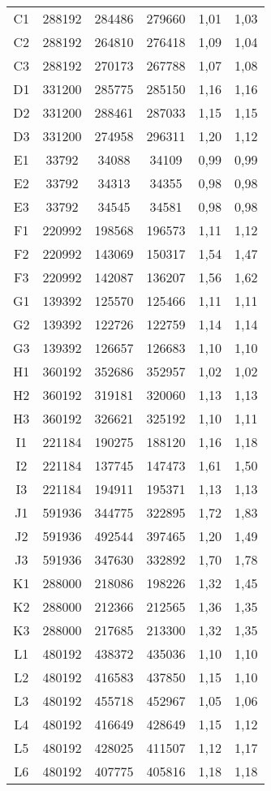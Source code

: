 \begin{center}
\begin{longtable}{cccccc}
    C1    & 288192 & 284486 & 279660 & 1,01  & 1,03 \\
    C2    & 288192 & 264810 & 276418 & 1,09  & 1,04 \\
    C3    & 288192 & 270173 & 267788 & 1,07  & 1,08 \\
    D1    & 331200 & 285775 & 285150 & 1,16  & 1,16 \\
    D2    & 331200 & 288461 & 287033 & 1,15  & 1,15 \\
    D3    & 331200 & 274958 & 296311 & 1,20  & 1,12 \\
    E1    & 33792 & 34088 & 34109 & 0,99  & 0,99 \\
    E2    & 33792 & 34313 & 34355 & 0,98  & 0,98 \\
    E3    & 33792 & 34545 & 34581 & 0,98  & 0,98 \\
    F1    & 220992 & 198568 & 196573 & 1,11  & 1,12 \\
    F2    & 220992 & 143069 & 150317 & 1,54  & 1,47 \\
    F3    & 220992 & 142087 & 136207 & 1,56  & 1,62 \\
    G1    & 139392 & 125570 & 125466 & 1,11  & 1,11 \\
    G2    & 139392 & 122726 & 122759 & 1,14  & 1,14 \\
    G3    & 139392 & 126657 & 126683 & 1,10  & 1,10 \\
    H1    & 360192 & 352686 & 352957 & 1,02  & 1,02 \\
    H2    & 360192 & 319181 & 320060 & 1,13  & 1,13 \\
    H3    & 360192 & 326621 & 325192 & 1,10  & 1,11 \\
    I1    & 221184 & 190275 & 188120 & 1,16  & 1,18 \\
    I2    & 221184 & 137745 & 147473 & 1,61  & 1,50 \\
    I3    & 221184 & 194911 & 195371 & 1,13  & 1,13 \\
    J1    & 591936 & 344775 & 322895 & 1,72  & 1,83 \\
    J2    & 591936 & 492544 & 397465 & 1,20  & 1,49 \\
    J3    & 591936 & 347630 & 332892 & 1,70  & 1,78 \\
    K1    & 288000 & 218086 & 198226 & 1,32  & 1,45 \\
    K2    & 288000 & 212366 & 212565 & 1,36  & 1,35 \\
    K3    & 288000 & 217685 & 213300 & 1,32  & 1,35 \\
    L1    & 480192 & 438372 & 435036 & 1,10  & 1,10 \\
    L2    & 480192 & 416583 & 437850 & 1,15  & 1,10 \\
    L3    & 480192 & 455718 & 452967 & 1,05  & 1,06 \\
    L4    & 480192 & 416649 & 428649 & 1,15  & 1,12 \\
    L5    & 480192 & 428025 & 411507 & 1,12  & 1,17 \\
    L6    & 480192 & 407775 & 405816 & 1,18  & 1,18 \\
\end{longtable}
\end{center}


